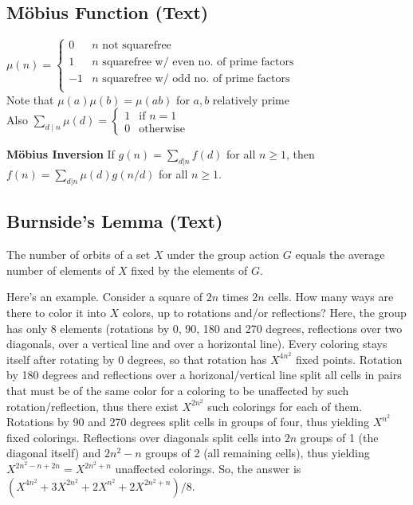 \documentclass[9pt]{extarticle}
\begin{document}
\begin{multicols*}{3}
\subsection{M\"obius Function (Text)} %
$\mu(n) = \begin{cases}
0 & \text{$n$ not squarefree} \\
1 & \text{$n$ squarefree w/ even no. of prime factors} \\
-1 & \text{$n$ squarefree w/ odd no. of prime factors} \\
\end{cases}$ \\
Note that $\mu(a) \mu(b) = \mu(ab)$ for $a, b$ relatively prime \\
Also $\sum_{d \mid n} \mu(d) = \begin{cases} 1 & \text{if $n = 1$} \\
0 & \text{otherwise} \end{cases}$

\textbf{M\"obius Inversion}
If $g(n) = \sum_{d|n} f(d)$ for all $n \ge 1$, then
$f(n) = \sum_{d|n} \mu(d)g(n/d)$ for all $n \ge 1$.

\subsection{Burnside's Lemma (Text)} %
The number of orbits of a set $X$ under the group action $G$ equals the average
number of elements of $X$ fixed by the elements of $G$.

Here's an example. Consider a square of $2n$ times $2n$ cells. How many ways
are there to color it into $X$ colors, up to rotations and/or reflections?
Here, the group has only 8 elements (rotations by 0, 90, 180 and 270 degrees,
reflections over two diagonals, over a vertical line and over a horizontal
line). Every coloring stays itself after rotating by 0 degrees, so that
rotation has $X^{4n^2}$ fixed points. Rotation by 180 degrees and reflections
over a horizonal/vertical line split all cells in pairs that must be of the
same color for a coloring to be unaffected by such rotation/reflection, thus
there exist $X^{2n^2}$ such colorings for each of them. Rotations by 90 and 270
degrees split cells in groups of four, thus yielding $X^{n^2}$ fixed colorings.
Reflections over diagonals split cells into $2n$ groups of 1 (the diagonal
itself) and $2n^2-n$ groups of 2 (all remaining cells), thus yielding
$X^{2n^2-n+2n}=X^{2n^2+n}$ unaffected colorings.  So, the answer is
$(X^{4n^2}+3X^{2n^2}+2X^{n^2}+2X^{2n^2+n})/8$.


\end{multicols*}
\end{document}
